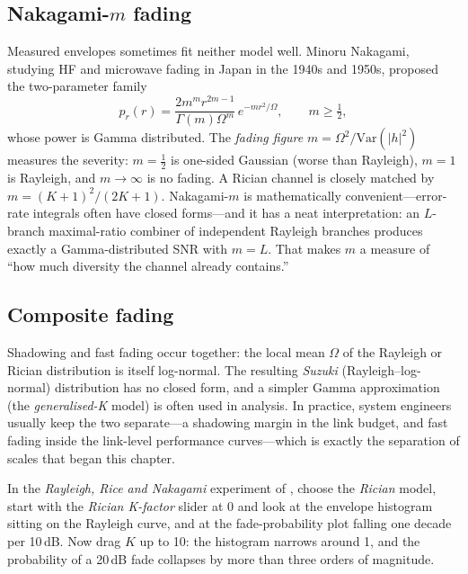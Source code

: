 
\subsection{Nakagami-$m$ fading}

Measured envelopes sometimes fit neither model well. Minoru Nakagami, studying HF and microwave
fading in Japan in the 1940s and 1950s, proposed the two-parameter family
\begin{equation}
p_r(r)=\frac{2m^m r^{2m-1}}{\Gamma(m)\Omega^m}\,e^{-mr^2/\Omega},\qquad m\ge\tfrac12,
\end{equation}
whose power is Gamma distributed. The \emph{fading figure} $m=\Omega^2/\mathrm{Var}(|h|^2)$
measures the severity: $m=\frac12$ is one-sided Gaussian (worse than Rayleigh), $m=1$ is Rayleigh,
and $m\to\infty$ is no fading. A Rician channel is closely matched by
$m=(K+1)^2/(2K+1)$. Nakagami-$m$ is mathematically convenient---error-rate integrals often have
closed forms---and it has a neat interpretation: an $L$-branch maximal-ratio combiner of
independent Rayleigh branches produces exactly a Gamma-distributed SNR with $m=L$. That makes
$m$ a measure of ``how much diversity the channel already contains.''



\subsection{Composite fading}

Shadowing and fast fading occur together: the local mean $\Omega$ of the Rayleigh or Rician
distribution is itself log-normal. The resulting \emph{Suzuki} (Rayleigh--log-normal) distribution
has no closed form, and a simpler Gamma approximation (the \emph{generalised-K} model) is often used
in analysis. In practice, system engineers usually keep the two separate---a shadowing margin in
the link budget, and fast fading inside the link-level performance curves---which is exactly the
separation of scales that began this chapter.

\begin{tryit}
In the \emph{Rayleigh, Rice and Nakagami} experiment of , choose the
\emph{Rician} model, start with the \emph{Rician K-factor} slider at 0 and look
at the envelope histogram sitting on the Rayleigh curve, and at the fade-probability plot falling
one decade per 10\,dB. Now drag $K$ up to 10: the histogram narrows around 1, and the probability
of a 20\,dB fade collapses by more than three orders of magnitude.
\end{tryit}

